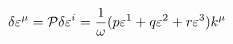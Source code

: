 \begin{equation}
\delta {\varepsilon}^{\mu} = {\cal P}\delta\varepsilon^{i}
= \frac{1}{\omega}( p\varepsilon^1 + q\varepsilon^2 + r\varepsilon^3)k^{\mu}
\label{96}
\end{equation}

